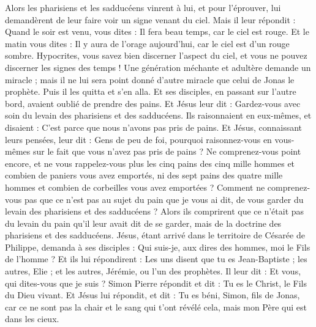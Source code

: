 \begin{multicols}{2}
\VerseOne{}Alors les pharisiens et les sadducéens vinrent à lui, et pour l'éprouver, lui demandèrent de leur faire voir un signe venant du ciel.
Mais il leur répondit : Quand le soir est venu, vous dites : Il fera beau temps, car le ciel est rouge.
Et le matin vous dites : Il y aura de l'orage aujourd'hui, car le ciel est d'un rouge sombre. Hypocrites, vous savez bien discerner l'aspect du ciel, et vous ne pouvez discerner les signes des temps !
Une génération méchante et adultère demande un miracle ; mais il ne lui sera point donné d'autre miracle que celui de Jonas le prophète. Puis il les quitta et s'en alla.
Et ses disciples, en passant sur l'autre bord, avaient oublié de prendre des pains.
Et Jésus leur dit : Gardez-vous avec soin du levain des pharisiens et des sadducéens.
Ils raisonnaient en eux-mêmes, et disaient : C'est parce que nous n'avons pas pris de pains.
Et Jésus, connaissant leurs pensées, leur dit : Gens de peu de foi, pourquoi raisonnez-vous en vous-mêmes sur le fait que vous n'avez pas pris de pains ?
Ne comprenez-vous point encore, et ne vous rappelez-vous plus les cinq pains des cinq mille hommes et combien de paniers vous avez emportés,
ni des sept pains des quatre mille hommes et combien de corbeilles vous avez emportées ?
Comment ne comprenez-vous pas que ce n'est pas au sujet du pain que je vous ai dit, de vous garder du levain des pharisiens et des sadducéens ?
Alors ils comprirent que ce n'était pas du levain du pain qu'il leur avait dit de se garder, mais de la doctrine des pharisiens et des sadducéens.
Jésus, étant arrivé dans le territoire de Césarée de Philippe, demanda à ses disciples : Qui suis-je, aux dires des hommes, moi le Fils de l'homme ?
Et ils lui répondirent : Les uns disent que tu es Jean-Baptiste ; les autres, Elie ; et les autres, Jérémie, ou l'un des prophètes.
Il leur dit : Et vous, qui dites-vous que je suis ?
Simon Pierre répondit et dit : Tu es le Christ, le Fils du Dieu vivant.
Et Jésus lui répondit, et dit : Tu es béni, Simon, fils de Jonas, car ce ne sont pas la chair et le sang qui t'ont révélé cela, mais mon Père qui est dans les cieux.

\end{multicols}
